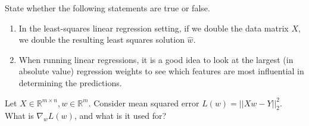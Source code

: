 \documentclass{article}
\newcounter{problem}
\begin{document}
	\begin{problem}[2]
		State whether the following statements are true or false.
		
		\begin{enumerate}[label=(\alph*),]
			\item In the least-squares linear regression setting, if we double the data matrix \(X\), we double the resulting least squares solution \(\hat{w}\).
			\item When running linear regressions, it is a good idea to look at the largest (in absolute value) regression weights to see which features are most influential in determining the predictions.
		\end{enumerate}
	\end{problem}

	\begin{problem}[2]
		Let \(X\in\mathbb{R}^{m\times n},w\in\mathbb{R}^m\). Consider mean squared error \(L(w)=||Xw-Y||^2_2\). What is \(\nabla_wL(w)\), and what is it used for?
	\end{problem}
	
\end{document}
